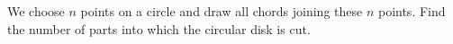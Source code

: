 We choose $n$ points on a circle and draw all chords joining these $n$ points. Find the number of parts into which the circular disk is cut.
